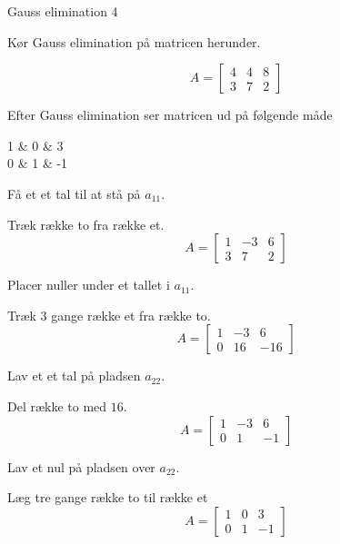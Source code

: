 \documentclass{article}
\begin{document}
\begin{exercise}{Gauss elimination 4}
	
	
	Kør Gauss elimination på matricen herunder.
	
	\[
	A = \left[\begin{array}{rr|r}
	4 & 4 & 8 \\ 
	3 & 7 & 2
	\end{array} \right]
	\]
	
	Efter Gauss elimination ser matricen ud på følgende måde
	\begin{answermatrix}
		1 & 0 & 3 \\
		0 & 1 & -1
	\end{answermatrix}
	
	\hint
	Få et et tal til at stå på $a_{11}$.
	
	\hint
	Træk række to fra række et.
	\[
	A = \left[\begin{array}{rr|r}
	1 & -3 & 6 \\ 
	3 & 7 & 2
	\end{array} \right]
	\]
	
	\hint
	Placer nuller under et tallet i $a_{11}$.
	
	\hint
	Træk 3 gange række et fra række to.
	\[
	A = \left[\begin{array}{rr|r}
	1 & -3 & 6 \\ 
	0 & 16 & -16
	\end{array} \right]
	\]
	
	\hint
	Lav et et tal på pladsen $a_{22}$.
	
	\hint
	Del række to med $16$.
	\[
	A = \left[\begin{array}{rr|r}
	1 & -3 & 6 \\ 
	0 & 1 & -1
	\end{array} \right]
	\]
	
	
	\hint
	Lav et nul på pladsen over $a_{22}$.
	
	\hint
	Læg tre gange række to til række et
	\[
	A = \left[\begin{array}{rr|r}
	1 & 0 & 3 \\ 
	0 & 1 & -1
	\end{array} \right]
	\]
	
	
\end{exercise}

\newpage
\end{document}
